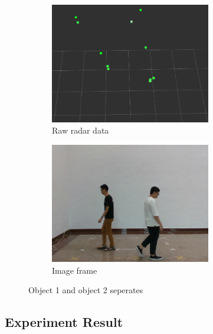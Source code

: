 \begin{figure}[!htb]
    \centering
    \begin{subfigure}{0.3\linewidth}
        \includegraphics[width=7cm]{Figures/after_conceal_radar.png}
        \caption{Raw radar data}
        \label{subfig:after_conceal_radar_fig}
    \end{subfigure}
    \hspace{0.15\textwidth}
    \begin{subfigure}{0.3\linewidth}
        \includegraphics[width=7cm]{Figures/after_conceal_image.png}
        \caption{Image frame}
        \label{subfig:after_conceal_image_fig}
    \end{subfigure}

    \caption{Object 1 and object 2 seperates}
    \label{fig:after_conceal_fig}
\end{figure}





\vspace*{5cm}
\subsection{Experiment Result}\label{sec:3-exp_result}
